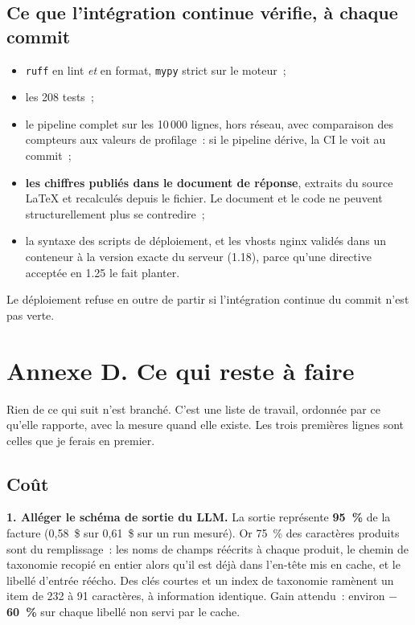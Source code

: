 \documentclass[11pt,a4paper]{article}
\newcommand{\code}[1]{\texttt{\small #1}}
\begin{document}
\subsection{Ce que l'intégration continue vérifie, à chaque commit}
\begin{itemize}
  \item \code{ruff} en lint \emph{et} en format, \code{mypy} strict sur le moteur~;
  \item les 208 tests~;
  \item le pipeline complet sur les 10\,000 lignes, hors réseau, avec comparaison des compteurs aux
        valeurs de profilage~: si le pipeline dérive, la CI le voit au commit~;
  \item \textbf{les chiffres publiés dans le document de réponse}, extraits du source \LaTeX{} et
        recalculés depuis le fichier. Le document et le code ne peuvent structurellement plus se
        contredire~;
  \item la syntaxe des scripts de déploiement, et les vhosts nginx validés dans un conteneur à la
        version exacte du serveur (1.18), parce qu'une directive acceptée en 1.25 le fait planter.
\end{itemize}

Le déploiement refuse en outre de partir si l'intégration continue du commit n'est pas verte.

\newpage
\section*{Annexe D. Ce qui reste à faire}

Rien de ce qui suit n'est branché. C'est une liste de travail, ordonnée par ce qu'elle rapporte,
avec la mesure quand elle existe. Les trois premières lignes sont celles que je ferais en premier.

\subsection{Coût}

\textbf{1. Alléger le schéma de sortie du LLM.} La sortie représente \textbf{95~\%} de la facture
(0,58~\$ sur 0,61~\$ sur un run mesuré). Or 75~\% des caractères produits sont du remplissage~:
les noms de champs réécrits à chaque produit, le chemin de taxonomie recopié en entier alors qu'il
est déjà dans l'en-tête mis en cache, et le libellé d'entrée réécho. Des clés courtes et un index
de taxonomie ramènent un item de 232 à 91 caractères, à information identique. Gain attendu~:
environ \textbf{$-$60~\%} sur chaque libellé non servi par le cache.
\end{document}
